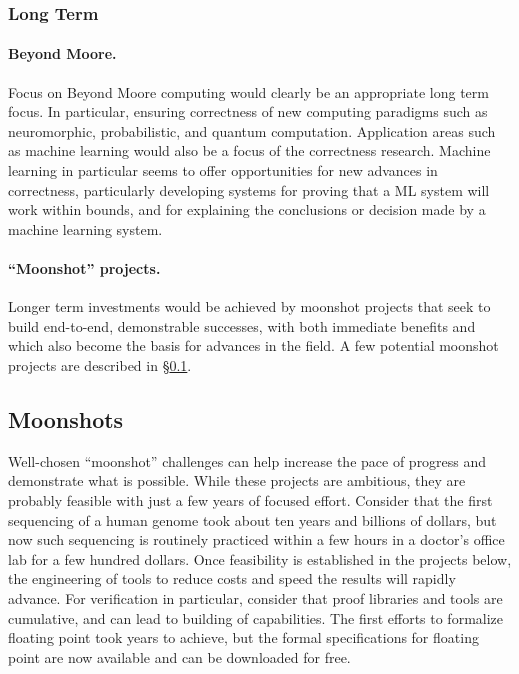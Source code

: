\subsubsection{Long Term}
 
\paragraph{Beyond Moore.}
Focus on Beyond Moore computing would clearly be an appropriate  long term focus.  In particular, ensuring correctness of new computing paradigms such as neuromorphic, probabilistic, and quantum computation.  Application areas such as machine learning would also be a focus of the correctness research.  Machine learning in particular seems to offer opportunities for new advances in correctness, particularly developing systems for proving that a ML system will work within bounds, and for explaining the conclusions or decision made by a machine learning system.

\paragraph{``Moonshot'' projects.}
Longer term investments would be achieved by moonshot projects that seek to build end-to-end, demonstrable successes, with both immediate benefits and which also become the basis for advances in the field.
A few potential moonshot projects are described in \S\ref{sec:iafre}.

\subsection{Moonshots}
\label{sec:iafre}

Well-chosen ``moonshot'' challenges can help increase the pace of progress and demonstrate what is possible.  While these projects are ambitious, they are probably feasible with just a few years of focused effort.  Consider that the first sequencing of a human genome took about ten years and billions of dollars, but now such sequencing is routinely practiced within a few hours in a doctor's office lab for a few hundred dollars.  Once feasibility is established in the projects below, the engineering of tools to reduce costs and speed the results will rapidly advance.  For verification in particular, consider that proof libraries and tools are cumulative, and can lead to building of capabilities.  The first efforts to formalize floating point took years to achieve, but the formal specifications for floating point are now available and can 
be downloaded for free.


